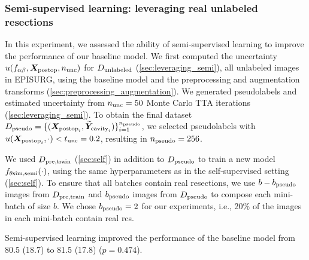 \subsubsection{Semi-supervised learning: leveraging real unlabeled resections}
\label{sec:results_semi}

\newcommand{\pseudo}{\st{pseudo}}

In this experiment, we assessed the ability of semi-supervised learning to improve the performance of our baseline model.
We first computed the uncertainty $u(f_{\alpha\beta}, \bm{X}_{\textnormal{postop}}, n_{\textnormal{unc}})$ for $D_{\textnormal{unlabeled}}$ (\cref{sec:leveraging_semi}), all unlabeled images in EPISURG, using the baseline model and the preprocessing and augmentation transforms (\cref{sec:preprocessing_augmentation}).
We generated pseudolabels and estimated uncertainty from $n_{\textnormal{unc}} = 50$ Monte Carlo \ac{TTA} iterations (\cref{sec:leveraging_semi}).
To obtain the final dataset $D\pseudo = \{ (\X_{\text{postop}_i}, \wt{\Y}_{\text{cavity}_i}) \}_{i = 1}^{n\pseudo}$, we selected pseudolabels with $u(\bm{X}_{\text{postop}_i}, \cdot) < t_{\textnormal{unc}} = 0.2$, resulting in $n\pseudo = 256$.

We used $D_{\textnormal{pre,train}}$ (\cref{sec:self}) in addition to $D\pseudo$ to train a new model $f_{\theta \text{sim,semi}}(\cdot)$, using the same hyperparameters as in the self-supervised setting (\cref{sec:self}).
To ensure that all batches contain real resections, we use $b - b\pseudo$ images from $D_{\textnormal{pre,train}}$ and $b\pseudo$ images from $D\pseudo$ to compose each mini-batch of size $b$.
We chose $b\pseudo = 2$ for our experiments, i.e., 20\% of the images in each mini-batch contain real \acp{rc}.

Semi-supervised learning improved the performance of the baseline model from 80.5 (18.7) to 81.5 (17.8) ($p = 0.474$).


